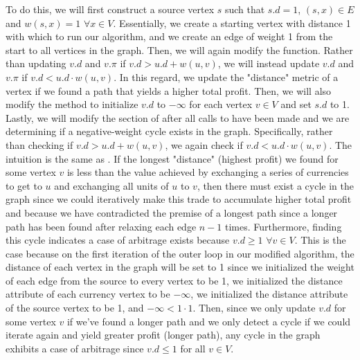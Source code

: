 \documentclass[11pt]{article}
\begin{document}
To do this, we will first construct a source vertex $s$ such that $s.d = 1$, $(s,x) \in E$ and $w(s,x) = 1$ $\forall x \in V$. Essentially, we create a starting vertex with distance 1 with which to run our algorithm, and we create an edge of weight 1 from the start to all vertices in the graph. Then, we will again modify the  function. Rather than updating $v.d$ and $v.\pi$ if $v.d > u.d + w(u,v)$, we will instead update $v.d$ and $v.\pi$ if $v.d < u.d \cdot w(u,v)$. In this regard, we update the "distance" metric of a vertex if we found a path that yields a higher total profit. Then, we will also modify the  method to initialize $v.d$ to $-\infty$ for each vertex $v \in V$ and set $s.d$ to 1. Lastly, we will modify the section of  after all calls to  have been made and we are determining if a negative-weight cycle exists in the graph. Specifically, rather than checking if $v.d > u.d + w(u,v)$, we again check if $v.d < u.d \cdot w(u,v)$. The intuition is the same as . If the longest "distance" (highest profit) we found for some vertex $v$ is less than the value achieved by exchanging a series of currencies to get to $u$ and exchanging all units of $u$ to $v$, then there must exist a cycle in the graph since we could iteratively make this trade to accumulate higher total profit and because we have contradicted the premise of a longest path since a longer path has been found after relaxing each edge $n-1$ times. Furthermore, finding this cycle indicates a case of arbitrage exists because $v.d \geq 1$ $\forall v \in V$. This is the case because on the first iteration of the outer loop in our modified  algorithm, the distance of each vertex in the graph will be set to 1 since we initialized the weight of each edge from the source to every vertex to be 1, we initialized the distance attribute of each currency vertex to be $-\infty$, we initialized the distance attribute of the source vertex to be 1, and $-\infty < 1 \cdot 1$. Then, since we only update $v.d$ for some vertex $v$ if we've found a longer path and we only detect a cycle if we could iterate again and yield greater profit (longer path), any cycle in the graph exhibits a case of arbitrage since $v.d \leq 1$ for all $v \in V$.
\end{document}

